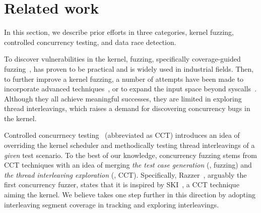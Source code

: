 \section{Related work}
\label{s:relwk}

%
In this section, we describe prior efforts in three categories, kernel
fuzzing, controlled concurrency testing, and data race detection.


%
To discover vulnerabilities in the kernel, fuzzing, specifically
coverage-guided fuzzing~\cite{syzkaller, moonshine, healer, hfl, imf,
  janus, hydra, trinity, kafl, periscope, syzvegas, ksg}, has proven
to be practical and is widely used in industrial fields.
%
%
Then, to further improve a kernel fuzzing, a number of attempts have
been made to incorporate advanced techniques~\cite{moonshine, healer, hfl},
%
or to expand the input space beyond syscalls~\cite{janus, hydra,
  periscope}.
%
Although they all achieve meaningful successes, they are limited in
exploring thread interleavings, which raises a demand for discovering
concurrency bugs in the kernel.







%
Controlled concurrnecy testing~\cite{ski, pctalgorithm, sparsernr,
  chess, nagarakatte2012multicore, abdelrasoul2017promoting,
  cai2016radius, mukherjee2020learning, schedulebounding} (abbreviated
as CCT) introduces an idea of overriding the kernel scheduler and
methodically testing thread interleavings of a \textit{given} test
scenario.
%
%
To the best of our knowledge, concurrency fuzzing stems from CCT
techniques with an idea of merging \textit{the test case generation}
(\ie, fuzzing) and \textit{the thread interleaving exploration} (\ie,
CCT).
%
Specifically, Razzer~\cite{razzer}, arguably the first concurrency
fuzzer, states that it is inspired by SKI~\cite{ski}, a CCT technique
aiming the kernel.
%
We believe \sys takes one step further in this direction by adopting
interleaving segment coverage in tracking and exploring interleavings.
%
%



